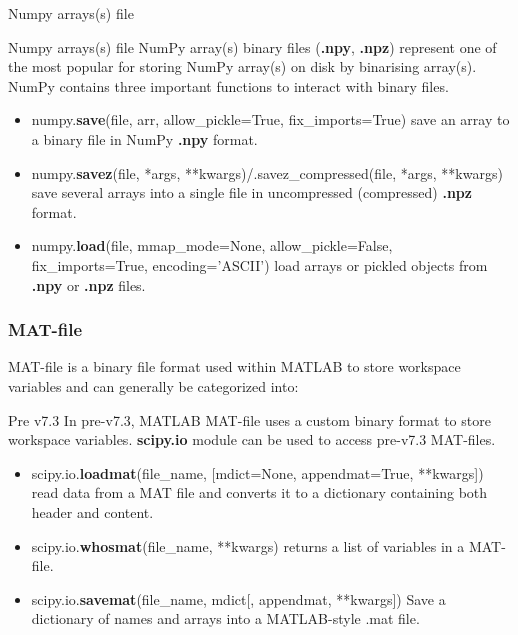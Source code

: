 \documentclass{beamer}
\begin{document}
\begin{frame}[fragile]{Numpy arrays(s) file}
    \begin{block}{Numpy arrays(s) file}
        NumPy array(s) binary files (\textbf{.npy}, \textbf{.npz}) represent one of the most popular for storing NumPy array(s) on disk by binarising array(s). NumPy contains three important functions to interact with binary files.
        \begin{itemize}
            \item numpy.\textbf{save}(file, arr, allow\_pickle=True, fix\_imports=True) save an array to a binary file in NumPy \textbf{.npy} format.
            \item numpy.\textbf{savez}(file, *args, **kwargs)/.savez\_compressed(file, *args, **kwargs) save several arrays into a single file in uncompressed (compressed) \textbf{.npz} format.
            \item numpy.\textbf{load}(file, mmap\_mode=None, allow\_pickle=False, fix\_imports=True, encoding='ASCII') load arrays or pickled objects from \textbf{.npy} or \textbf{.npz} files.
        \end{itemize}
    \end{block}
\end{frame}

\begin{frame}
\frametitle{MAT-file}
MAT-file is a binary file format used within MATLAB to store workspace variables and can generally be categorized into:
    \begin{block}{Pre v7.3}
        In pre-v7.3, MATLAB MAT-file uses a custom binary format to store workspace variables. \textbf{scipy.io} module can be used to access pre-v7.3 MAT-files.
        \begin{itemize}
            \item scipy.io.\textbf{loadmat}(file\_name, [mdict=None, appendmat=True, **kwargs]) read data from a MAT file and converts it to a dictionary containing both header and content.
            \item scipy.io.\textbf{whosmat}(file\_name, **kwargs) returns a list of variables in a MAT-file.
            \item scipy.io.\textbf{savemat}(file\_name, mdict[, appendmat, **kwargs]) Save a dictionary of names and arrays into a MATLAB-style .mat file.
        \end{itemize}
    \end{block}
\end{frame}
\end{document}
